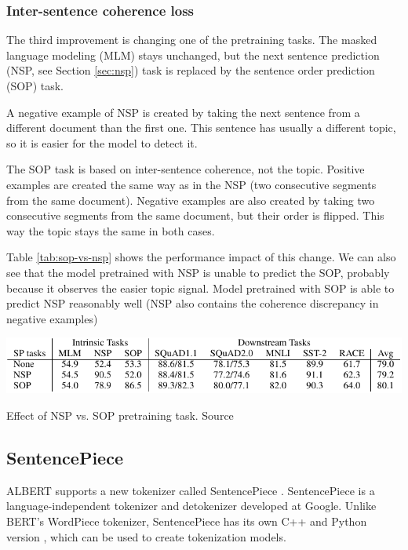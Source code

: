 \documentclass[
  printed, %
  color,   %
  table,   %
  oneside, %
  lof,     %
  lot,     %
]{fithesis3}
\begin{document}
\subsubsection{Inter-sentence coherence loss}
The third improvement is changing one of the pretraining tasks. The masked language modeling (MLM) stays unchanged, but the next sentence prediction (NSP, see Section \ref{sec:nsp}) task is replaced by the sentence order prediction (SOP) task.

A negative example of NSP is created by taking the next sentence from a different document than the first one. This sentence has usually a different topic, so it is easier for the model to detect it.

The SOP task is based on inter-sentence coherence, not the topic. Positive examples are created the same way as in the NSP (two consecutive segments from the same document). Negative examples are also created by taking two consecutive segments from the same document, but their order is flipped. This way the topic stays the same in both cases.

Table \ref{tab:sop-vs-nsp} shows the performance impact of this change. We can also see that the model pretrained with NSP is unable to predict the SOP, probably because it observes the easier topic signal. Model pretrained with SOP is able to predict NSP reasonably well (NSP also contains the coherence discrepancy in negative examples)

\begin{table}[h]
  \begin{center}
    \includegraphics[width=\linewidth]{img/sop-vs-nsp.pdf}
  \end{center}
  \vspace{-0.5cm}
  \caption[Effect of NSP vs. SOP pretraining task]
    {Effect of NSP vs. SOP pretraining task. Source \parencite[Table 5]{albert}}
  \label{tab:sop-vs-nsp}
\end{table}


\subsection{SentencePiece}
\label{sec:sentencepiece}

ALBERT supports a new tokenizer called SentencePiece \parencite{sentencepiece}. SentencePiece is a language-independent tokenizer and detokenizer developed at Google. Unlike BERT's WordPiece tokenizer, SentencePiece has its own C++ and Python version \parencite{spgit}, which can be used to create tokenization models.
\end{document}
